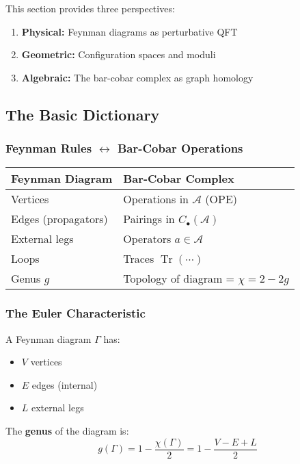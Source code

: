This section provides three perspectives:
\begin{enumerate}
\item \textbf{Physical:} Feynman diagrams as perturbative QFT
\item \textbf{Geometric:} Configuration spaces and moduli
\item \textbf{Algebraic:} The bar-cobar complex as graph homology
\end{enumerate}

\subsection{The Basic Dictionary}

\subsubsection{Feynman Rules $\leftrightarrow$ Bar-Cobar Operations}

\begin{center}
\begin{tabular}{|l|l|}
\hline
\textbf{Feynman Diagram} & \textbf{Bar-Cobar Complex} \\
\hline
Vertices & Operations in $\mathcal{A}$ (OPE) \\
Edges (propagators) & Pairings in $C_{\bullet}(\mathcal{A})$ \\
External legs & Operators $a \in \mathcal{A}$ \\
Loops & Traces $\operatorname{Tr}(\cdots)$ \\
Genus $g$ & Topology of diagram = $\chi = 2-2g$ \\
\hline
\end{tabular}
\end{center}

\subsubsection{The Euler Characteristic}

A Feynman diagram $\Gamma$ has:
\begin{itemize}
\item $V$ vertices
\item $E$ edges (internal)
\item $L$ external legs
\end{itemize}

The \textbf{genus} of the diagram is:
$$g(\Gamma) = 1 - \frac{\chi(\Gamma)}{2} = 1 - \frac{V - E + L}{2}$$

